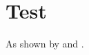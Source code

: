 \documentclass{article}
\begin{document}
\section{Test}\label{sec:test}
As shown by  and .


\end{document}
